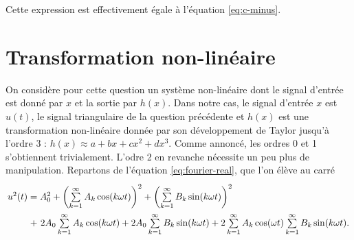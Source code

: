 Cette expression est effectivement égale à
l'équation \ref{eq:c-minus}.

\section{Transformation non-linéaire}

On considère pour cette question un système non-linéaire
dont le signal d'entrée est donné par $x$ et la sortie
par $h(x)$.
Dans notre cas, le signal d'entrée $x$ est $u(t)$,
le signal triangulaire de la question précédente et
$h(x)$ est une transformation non-linéaire donnée par
son développement de Taylor jusqu'à l'ordre 3 :
$h(x) \approx a+bx+cx^2+dx^3$.
Comme annoncé, les ordres 0 et 1 s'obtiennent trivialement.
L'odre 2 en revanche nécessite un peu plus de manipulation.
Repartons de l'équation \ref{eq:fourier-real}, que l'on
élève au carré
\[\arraycolsep=1.4pt\def\arraystretch{2.2}
	\begin{array}{cl}
		 u^2(t)	&= A_0^2 + \left(\sum\limits_{k=1}^\infty A_k\cos(k\omega t)\right)^2 + \left(\sum\limits_{k=1}^\infty B_k\sin(k\omega t)\right)^2\\ 
						&+~ 2A_0\sum\limits_{k=1}^\infty A_k\cos(k\omega t) + 2A_0\sum\limits_{k=1}^\infty B_k\sin(k\omega t)
						+ 2\sum\limits_{k=1}^\infty A_k\cos(\omega t)\sum\limits_{k=1}^{\infty}B_k\sin(k\omega t). 
	\end{array}
\]

